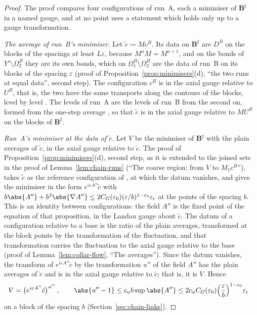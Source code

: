 \begin{proof}
The proof compares four configurations of run~A, each a minimiser of $\mathbf B^\sharp$ in a named gauge, and at no point uses a statement which holds only up to a gauge transformation.

\emph{The average of run~B's minimiser.} Let $\tilde c \coloneqq Mc^B$. Its data on $\mathbf B^\sharp$ are $D^B$ on the blocks of the spacings at least $L\varepsilon$, because $M^nM = M^{n+1}$, and on the bonds of $Y' \setminus \Omega^B_2$ they are its own bonds, which on $\Omega^B_1 \setminus \Omega^B_2$ are the data of run~B on its blocks of the spacing $\varepsilon$ (proof of Proposition~\ref{prop:minimisers}(d), ``the two runs at equal data'', second step). The configuration $c^B$ is in the axial gauge relative to $U^B$, that is, the two have the same transports along the contours of the blocks, level by level \cite[(1.19), (1.20), p.~79]{BalabanREG}. The levels of run~A are the levels of run~B from the second on, formed from the one-step average \cite[(90), (91), p.~31]{BalabanAVG}, so that $\tilde c$ is in the axial gauge relative to $MU^B$ on the blocks of $\mathbf B^\sharp$.

\emph{Run~A's minimiser at the data of $\tilde c$.} Let $V$ be the minimiser of $\mathbf B^\sharp$ with the plain averages of $\tilde c$, in the axial gauge relative to $\tilde c$. The proof of Proposition~\ref{prop:minimisers}(d), second step, as it is extended to the joined sets in the proof of Lemma~\ref{lem:chain-runs} (``The coarse region: from $V$ to $M_1c^B$''), takes $\tilde c$ as the reference configuration of \cite[Proposition~5, p.~294]{BalabanVAR}, at which the datum \cite[(20)]{BalabanVAR} vanishes, and gives the minimiser in the form $e^{i\varepsilon A''}\tilde c$ with $b\abs{A''} + b^2\abs{\nabla A''} \leq 2C_G(\varepsilon_0)(\varepsilon/b)^{1-\varepsilon_0}\varepsilon_{\mathrm r}$ at the points of the spacing $b$. This is an identity between configurations: the field $A''$ is the fixed point of the equation of that proposition, in the Landau gauge about $\tilde c$. The datum \cite[(20)]{BalabanVAR} of a configuration relative to a base is the ratio of the plain averages, transformed at the block points by the transformation \cite[(106), p.~33]{BalabanAVG} of the fluctuation, and that transformation carries the fluctuation to the axial gauge relative to the base \cite[(64)--(72), p.~29]{BalabanAVG} (proof of Lemma~\ref{lem:collar-flow}, ``The averages''). Since the datum vanishes, the transform of $e^{i\varepsilon A''}\tilde c$ by the transformation $u''$ of the field $A''$ has the plain averages of $\tilde c$ and is in the axial gauge relative to $\tilde c$; that is, it is $V$. Hence
\[
    V = \bigl(e^{i\varepsilon A''}\tilde c\bigr)^{u''}\;,
    \qquad
    \abs{u'' - 1} \leq c_ub\sup\abs{A''} \leq 2c_uC_G(\varepsilon_0)\Bigl(\frac{\varepsilon}{b}\Bigr)^{1-\varepsilon_0}\varepsilon_{\mathrm r}
\]
on a block of the spacing $b$ (Section~\ref{sec:chain-links}).


\end{proof}
